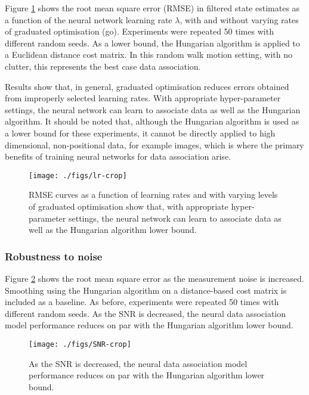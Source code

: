 \documentclass[journal]{IEEEtran}
\begin{document}
Figure \ref{fig:learning} shows the root mean square error (RMSE) in filtered state estimates as a function of the neural network learning rate $\lambda$, with and without varying rates of graduated optimisation (go). Experiments were repeated 50 times with different random seeds. As a lower bound, the Hungarian algorithm is applied to a Euclidean distance cost matrix. In this random walk motion setting, with no clutter, this represents the best case data association.

Results show that, in general, graduated optimisation reduces errors obtained from improperly selected learning rates. With appropriate hyper-parameter settings, the neural network can learn to associate data as well as the Hungarian algorithm. It should be noted that, although the Hungarian algorithm is used as a lower bound for these experiments, it cannot be directly applied to high dimensional, non-positional data, for example images, which is where the primary benefits of training neural networks for data association arise.  
\begin{figure}
    \centering
    \texttt{[image: ./figs/lr-crop]}
    \caption{RMSE curves as a function of learning rates and with varying levels of graduated optimisation show that, with appropriate hyper-parameter settings, the neural network can learn to associate data as well as the Hungarian algorithm lower bound.}
    \label{fig:learning}
\end{figure}

\subsubsection{Robustness to noise}

Figure \ref{fig:noise} shows the root mean square error as the measurement noise is increased. Smoothing using the Hungarian algorithm on a distance-based cost matrix is included as a baseline. As before, experiments were repeated 50 times with different random seeds. As the SNR is decreased, the neural data association model performance reduces on par with the Hungarian algorithm lower bound.
\begin{figure}
    \centering
    \texttt{[image: ./figs/SNR-crop]}
    \caption{As the SNR is decreased, the neural data association model performance reduces on par with the Hungarian algorithm lower bound.}
    \label{fig:noise}
\end{figure}

\end{document}
